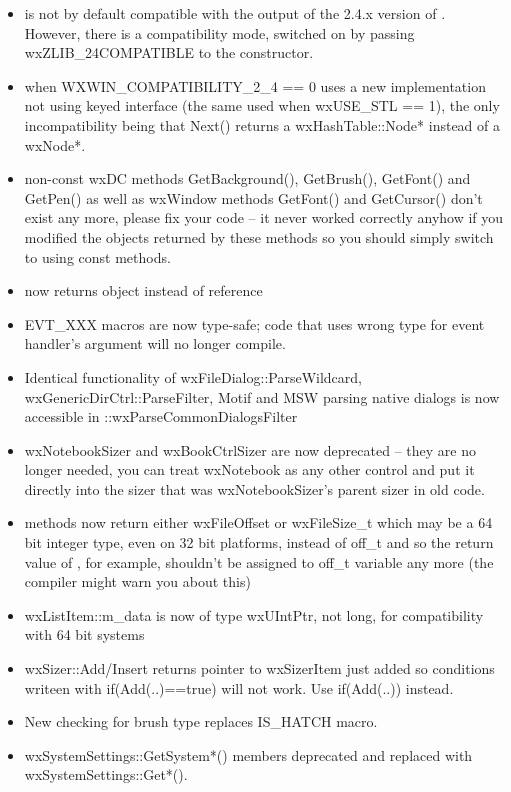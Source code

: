 \begin{itemize}
\item {} is not by default compatible with the output of the 2.4.x version of . However, there is a compatibility mode, switched on by passing wxZLIB\_24COMPATIBLE to the constructor.
\item when WXWIN\_COMPATIBILITY\_2\_4 == 0  uses a new implementation not using  keyed interface (the same used when wxUSE\_STL == 1), the only incompatibility being that Next() returns a wxHashTable::Node* instead of a wxNode*.
\item non-const wxDC methods GetBackground(), GetBrush(), GetFont() and GetPen() as well as wxWindow methods GetFont() and GetCursor() don't exist any more, please fix your code -- it never worked correctly anyhow if you modified the objects returned by these methods so you should simply switch to using const methods.
\item {} now returns  object instead of reference
\item EVT\_XXX macros are now type-safe; code that uses wrong type for event handler's argument will no longer compile.
\item Identical functionality of wxFileDialog::ParseWildcard, wxGenericDirCtrl::ParseFilter, Motif and MSW parsing native dialogs is now accessible in ::wxParseCommonDialogsFilter
\item wxNotebookSizer and wxBookCtrlSizer are now deprecated -- they are no longer needed, you can treat wxNotebook as any other control and put it directly into the sizer that was wxNotebookSizer's parent sizer in old code.
\item {} methods now return either wxFileOffset or wxFileSize\_t which may be a 64 bit integer type, even on 32 bit platforms, instead of off\_t and so the return value of , for example, shouldn't be assigned to off\_t variable any more (the compiler might warn you about this)
\item wxListItem::m\_data is now of type wxUIntPtr, not long, for compatibility with 64 bit systems
\item wxSizer::Add/Insert returns pointer to wxSizerItem just added so conditions writeen with if(Add(..)==true) will not work. Use if(Add(..)) instead.
\item New  checking for brush type replaces IS\_HATCH macro.
\item wxSystemSettings::GetSystem*() members deprecated and replaced with wxSystemSettings::Get*().
\end{itemize}

